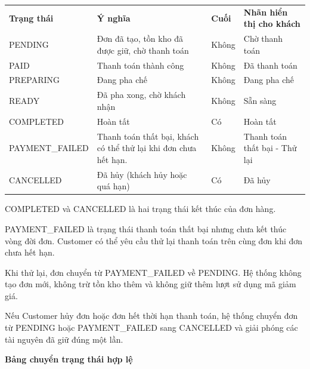 \documentclass[11pt,a4paper,oneside]{report}
\begin{document}
\begin{longtable}[]{@{}
  >{\raggedright\arraybackslash}p{}
  >{\raggedright\arraybackslash}p{}
  >{\raggedright\arraybackslash}p{}
  >{\raggedright\arraybackslash}p{}@{}}
\toprule\noalign{}
\endhead
\bottomrule\noalign{}
\endlastfoot
\textbf{Trạng thái} & \textbf{Ý nghĩa} & \textbf{Cuối} & \textbf{Nhãn hiển thị cho khách} \\
PENDING & Đơn đã tạo, tồn kho đã được giữ, chờ thanh toán & Không & Chờ thanh toán \\
PAID & Thanh toán thành công & Không & Đã thanh toán \\
PREPARING & Đang pha chế & Không & Đang pha chế \\
READY & Đã pha xong, chờ khách nhận & Không & Sẵn sàng \\
COMPLETED & Hoàn tất & Có & Hoàn tất \\
PAYMENT\_FAILED & Thanh toán thất bại, khách có thể thử lại khi đơn chưa hết hạn. & Không & Thanh toán thất bại - Thử lại \\
CANCELLED & Đã hủy (khách hủy hoặc quá hạn) & Có & Đã hủy \\
\end{longtable}

COMPLETED và CANCELLED là hai trạng thái kết thúc của đơn hàng.

PAYMENT\_FAILED là trạng thái thanh toán thất bại nhưng chưa kết thúc vòng đời đơn. Customer có thể yêu cầu thử lại thanh toán trên cùng đơn khi đơn chưa hết hạn.

Khi thử lại, đơn chuyển từ PAYMENT\_FAILED về PENDING. Hệ thống không tạo đơn mới, không trừ tồn kho thêm và không giữ thêm lượt sử dụng mã giảm giá.

Nếu Customer hủy đơn hoặc đơn hết thời hạn thanh toán, hệ thống chuyển đơn từ PENDING hoặc PAYMENT\_FAILED sang CANCELLED và giải phóng các tài nguyên đã giữ đúng một lần.

\textbf{Bảng chuyển trạng thái hợp lệ}
\end{document}
